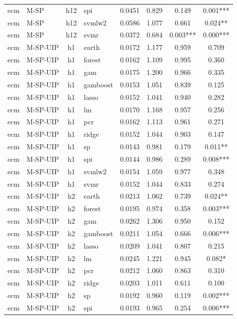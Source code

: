 \begin{ThreePartTable}
\begin{longtable}[t]{llclcccc}
ecm & M-SP & h12 & spi & 0.0451 & 0.829 & 0.149 & 0.001***\\
ecm & M-SP & h12 & svmlw2 & 0.0586 & 1.077 & 0.661 & 0.024**\\
ecm & M-SP & h12 & svmr & 0.0372 & 0.684 & 0.003*** & 0.000***\\
\addlinespace
ecm & M-SP-UIP & h1 & earth & 0.0172 & 1.177 & 0.959 & 0.709\\
ecm & M-SP-UIP & h1 & forest & 0.0162 & 1.109 & 0.995 & 0.360\\
ecm & M-SP-UIP & h1 & gam & 0.0175 & 1.200 & 0.966 & 0.335\\
ecm & M-SP-UIP & h1 & gamboost & 0.0153 & 1.051 & 0.839 & 0.125\\
ecm & M-SP-UIP & h1 & lasso & 0.0152 & 1.041 & 0.940 & 0.282\\
ecm & M-SP-UIP & h1 & lm & 0.0170 & 1.168 & 0.957 & 0.256\\
ecm & M-SP-UIP & h1 & pcr & 0.0162 & 1.113 & 0.961 & 0.271\\
ecm & M-SP-UIP & h1 & ridge & 0.0152 & 1.044 & 0.903 & 0.147\\
ecm & M-SP-UIP & h1 & sp & 0.0143 & 0.981 & 0.179 & 0.011**\\
ecm & M-SP-UIP & h1 & spi & 0.0144 & 0.986 & 0.289 & 0.008***\\
ecm & M-SP-UIP & h1 & svmlw2 & 0.0154 & 1.059 & 0.977 & 0.348\\
ecm & M-SP-UIP & h1 & svmr & 0.0152 & 1.044 & 0.833 & 0.274\\
\addlinespace
ecm & M-SP-UIP & h2 & earth & 0.0213 & 1.062 & 0.739 & 0.024**\\
ecm & M-SP-UIP & h2 & forest & 0.0195 & 0.974 & 0.358 & 0.003***\\
ecm & M-SP-UIP & h2 & gam & 0.0262 & 1.306 & 0.950 & 0.152\\
ecm & M-SP-UIP & h2 & gamboost & 0.0211 & 1.054 & 0.666 & 0.006***\\
ecm & M-SP-UIP & h2 & lasso & 0.0209 & 1.041 & 0.807 & 0.215\\
ecm & M-SP-UIP & h2 & lm & 0.0245 & 1.221 & 0.945 & 0.082*\\
ecm & M-SP-UIP & h2 & pcr & 0.0212 & 1.060 & 0.863 & 0.310\\
ecm & M-SP-UIP & h2 & ridge & 0.0203 & 1.011 & 0.611 & 0.100\\
ecm & M-SP-UIP & h2 & sp & 0.0192 & 0.960 & 0.119 & 0.002***\\
ecm & M-SP-UIP & h2 & spi & 0.0193 & 0.965 & 0.254 & 0.006***\\

\end{longtable}
\end{ThreePartTable}
